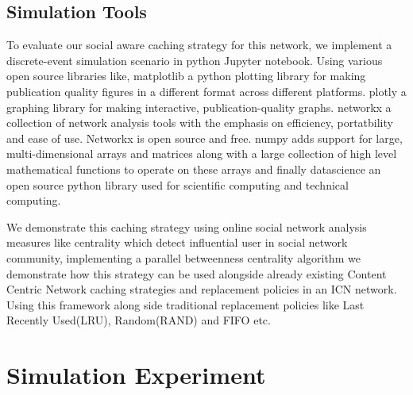 \subsection{Simulation Tools}

To evaluate our social aware caching strategy for this network, we implement a discrete-event simulation scenario in python Jupyter notebook. Using various open source libraries like, matplotlib a python plotting library for making publication quality figures in a different format across different platforms. plotly a graphing library for making interactive, publication-quality graphs. networkx a collection of network analysis tools with the emphasis on efficiency, portatbility and ease of use. Networkx is open source and free. numpy  adds support for large, multi-dimensional arrays and matrices along with a large collection of high level mathematical functions to operate on these arrays and finally datascience an open source python library used for scientific computing and technical computing. 

We demonstrate this caching strategy using online social network analysis measures like centrality which detect influential user in social network community, implementing a parallel betweenness centrality algorithm we demonstrate how this strategy can be used alongside already existing Content Centric Network caching strategies and replacement policies in an ICN network. Using this framework along side traditional replacement policies like Last Recently Used(LRU), Random(RAND) and FIFO etc. 



\section{Simulation Experiment}

